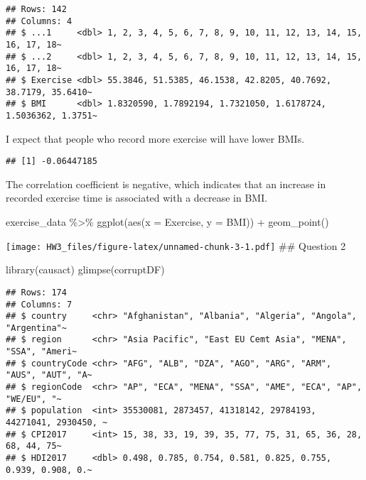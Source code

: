 \documentclass[
]{article}
\newenvironment{Shaded}{\begin{snugshade}}{\end{snugshade}}
\newcommand{\AttributeTok}[1]{\textcolor[rgb]{0.77,0.63,0.00}{#1}}
\newcommand{\FunctionTok}[1]{\textcolor[rgb]{0.00,0.00,0.00}{#1}}
\newcommand{\NormalTok}[1]{#1}
\newcommand{\SpecialCharTok}[1]{\textcolor[rgb]{0.00,0.00,0.00}{#1}}
\begin{document}
\begin{verbatim}
## Rows: 142
## Columns: 4
## $ ...1     <dbl> 1, 2, 3, 4, 5, 6, 7, 8, 9, 10, 11, 12, 13, 14, 15, 16, 17, 18~
## $ ...2     <dbl> 1, 2, 3, 4, 5, 6, 7, 8, 9, 10, 11, 12, 13, 14, 15, 16, 17, 18~
## $ Exercise <dbl> 55.3846, 51.5385, 46.1538, 42.8205, 40.7692, 38.7179, 35.6410~
## $ BMI      <dbl> 1.8320590, 1.7892194, 1.7321050, 1.6178724, 1.5036362, 1.3751~
\end{verbatim}

I expect that people who record more exercise will have lower BMIs.

\begin{Shaded}
\end{Shaded}

\begin{verbatim}
## [1] -0.06447185
\end{verbatim}

The correlation coefficient is negative, which indicates that an
increase in recorded exercise time is associated with a decrease in BMI.

\begin{Shaded}
\begin{Highlighting}[]
\NormalTok{exercise\_data }\SpecialCharTok{\%\textgreater{}\%} 
  \FunctionTok{ggplot}\NormalTok{(}\FunctionTok{aes}\NormalTok{(}\AttributeTok{x =}\NormalTok{ Exercise, }
              \AttributeTok{y =}\NormalTok{ BMI)) }\SpecialCharTok{+}
  \FunctionTok{geom\_point}\NormalTok{()}
\end{Highlighting}
\end{Shaded}

\texttt{[image: HW3\_files/figure-latex/unnamed-chunk-3-1.pdf]} \#\#
Question 2

\begin{Shaded}
\begin{Highlighting}[]
\FunctionTok{library}\NormalTok{(causact)}
\FunctionTok{glimpse}\NormalTok{(corruptDF)}
\end{Highlighting}
\end{Shaded}

\begin{verbatim}
## Rows: 174
## Columns: 7
## $ country     <chr> "Afghanistan", "Albania", "Algeria", "Angola", "Argentina"~
## $ region      <chr> "Asia Pacific", "East EU Cemt Asia", "MENA", "SSA", "Ameri~
## $ countryCode <chr> "AFG", "ALB", "DZA", "AGO", "ARG", "ARM", "AUS", "AUT", "A~
## $ regionCode  <chr> "AP", "ECA", "MENA", "SSA", "AME", "ECA", "AP", "WE/EU", "~
## $ population  <int> 35530081, 2873457, 41318142, 29784193, 44271041, 2930450, ~
## $ CPI2017     <int> 15, 38, 33, 19, 39, 35, 77, 75, 31, 65, 36, 28, 68, 44, 75~
## $ HDI2017     <dbl> 0.498, 0.785, 0.754, 0.581, 0.825, 0.755, 0.939, 0.908, 0.~
\end{verbatim}
\end{document}
